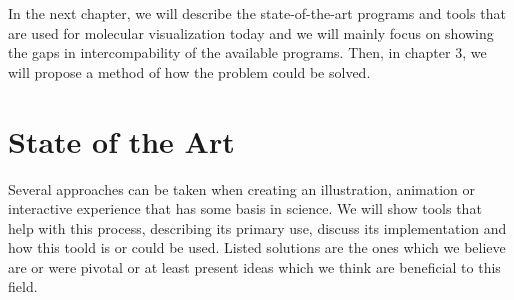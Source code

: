\documentclass[
  digital, %
  table,   %
  nolof,     %
  nolot,     %
]{fithesis3}
\begin{document}



In the next chapter, we will describe the state-of-the-art programs and tools that are used for molecular visualization today and we will mainly focus on showing the gaps in intercompability of the available programs. Then, in chapter 3, we will propose a method of how the problem could be solved.

\chapter{State of the Art}
\label{chap:star}
Several approaches can be taken when creating an illustration, animation or interactive experience that has some basis in science. We will show tools that help with this process, describing its primary use, discuss its implementation and how this toold is or could be used. Listed solutions are the ones which we believe are or were pivotal or at least present ideas which we think are beneficial to this field.
\end{document}
